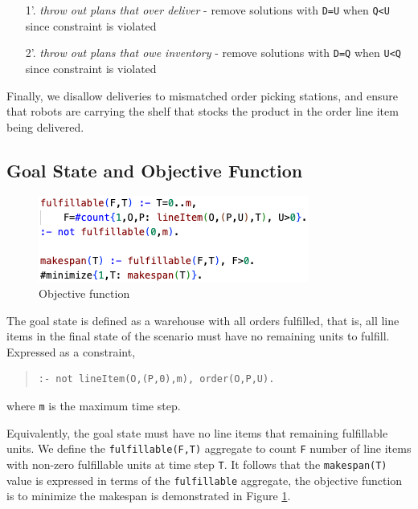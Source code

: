 \documentclass[letterpaper]{article}
\newcommand{\ct}[1]{\texttt{#1}}
\begin{document}
\begin{enumerate}
    \item[1'.] \textit{throw out plans that over deliver} - remove solutions with \ct{D=U} when \ct{Q<U} since constraint is violated
    \item[2'.] \textit{throw out plans that owe inventory} - remove solutions with \ct{D=Q} when \ct{U<Q} since constraint is violated
\end{enumerate}

Finally, we disallow deliveries to mismatched order picking stations, and ensure that robots are carrying the shelf that stocks the product in the order line item being delivered.

\subsection{Goal State and Objective Function}

\begin{figure}[t]
    \centering
    \includegraphics[width=0.9\columnwidth]{obj.png}
    \caption{Objective function}
\label{fig4:image}
\end{figure}

The goal state is defined as a warehouse with all orders fulfilled, that is, all line items in the final state of the scenario must have no remaining units to fulfill. Expressed as a constraint,

\begin{quote}\begin{small}\begin{verbatim}
:- not lineItem(O,(P,0),m), order(O,P,U).
\end{verbatim}\end{small}\end{quote}
where \ct{m} is the maximum time step.

Equivalently, the goal state must have no line items that remaining fulfillable units. We define the \ct{fulfillable(F,T)} aggregate to count \ct{F} number of line items with non-zero fulfillable units at time step \ct{T}. It follows that the \ct{makespan(T)} value is expressed in terms of the \ct{fulfillable} aggregate, the objective function is to minimize the makespan is demonstrated in Figure \ref{fig4:image}.
\end{document}
